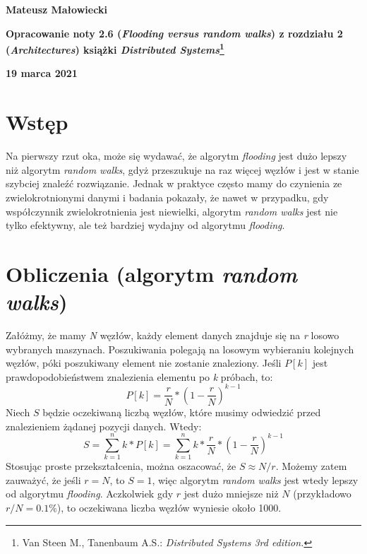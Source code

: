 \documentclass[10pt, a4paper]{article}
\begin{document}
\begin{titlepage}
\begin{center}
\large
\textbf{Mateusz Małowiecki}

\vspace{0.4cm}
\Large
\textbf{Opracowanie noty 2.6 (\textit{Flooding versus random walks}) z rozdziału 2 (\textit{Architectures}) książki \textit{Distributed Systems}\footnote{Van Steen M., Tanenbaum A.S.: \textit{ Distributed Systems 3rd edition.}}}

\vspace{0.4cm}
\large
\textbf{19 marca 2021}
\end{center}
\end{titlepage}
\section*{Wstęp}
Na pierwszy rzut oka, może się wydawać, że algorytm \textit{flooding} jest dużo lepszy niż algorytm \textit{random walks}, gdyż przeszukuje na raz więcej węzłów i jest w stanie szybciej znaleźć rozwiązanie. Jednak w praktyce często mamy do czynienia ze zwielokrotnionymi danymi i badania pokazały, że nawet w przypadku, gdy współczynnik zwielokrotnienia jest niewielki, algorytm \textit{random walks} jest nie tylko efektywny, ale też bardziej wydajny od algorytmu \textit{flooding}.
\section*{Obliczenia (algorytm \textit{random walks})}
Załóżmy, że mamy \textit{N} węzłów, każdy element danych znajduje się na \textit{r} losowo wybranych maszynach. Poszukiwania polegają na losowym wybieraniu kolejnych węzłów, póki poszukiwany element nie zostanie znaleziony. Jeśli $P[k]$ jest prawdopodobieństwem znalezienia elementu po \textit{k} próbach, to:​
\begin{equation}
P[k] = \frac{r}{N}*(1-\frac{r}{N})^{k-1}
\end{equation}
Niech $S$ będzie oczekiwaną liczbą węzłów, które musimy odwiedzić przed znalezieniem żądanej pozycji danych. Wtedy:
\begin{equation}
S = \sum_{k=1}^{n} k * P[k] = \sum_{k=1}^{n} k *\frac{r}{N}*(1-\frac{r}{N})^{k-1}
\end{equation}
Stosując proste przekształcenia, można oszacować, że $S \approx N/r $. Możemy zatem zauważyć, że jeśli $r = N$, to $S=1$, więc algorytm \textit{random walks} jest wtedy lepszy od algorytmu \textit{flooding}. Aczkolwiek gdy $r$ jest dużo mniejsze niż $N$ (przykładowo $r/N = 0.1\% $), to oczekiwana liczba węzłów wyniesie około 1000.
\end{document}
